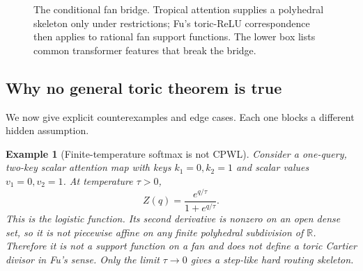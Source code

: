 \documentclass[11pt]{article}
\newtheorem{example}[theorem]{Example}
\newcommand{\R}{\mathbb{R}}
\begin{document}
\begin{figure}[t]
\centering
{}
\caption{The conditional fan bridge.  Tropical attention supplies a polyhedral skeleton only under restrictions; Fu's toric-ReLU correspondence \cite{fu2025toricrelu} then applies to rational fan support functions.  The lower box lists common transformer features that break the bridge.}
\label{fig:toricbridge}
\end{figure}

\subsection{Why no general toric theorem is true}

We now give explicit counterexamples and edge cases.  Each one blocks a different hidden assumption.

\begin{example}[Finite-temperature softmax is not CPWL]
\label{ex:softmax}
Consider a one-query, two-key scalar attention map with keys $k_1=0,k_2=1$ and scalar values $v_1=0,v_2=1$.  At temperature $\tau>0$,
\[
  Z(q)=\frac{e^{q/\tau}}{1+e^{q/\tau}}.
\]
This is the logistic function.  Its second derivative is nonzero on an open dense set, so it is not piecewise affine on any finite polyhedral subdivision of $\R$.  Therefore it is not a support function on a fan and does not define a toric Cartier divisor in Fu's sense.  Only the limit $\tau\to 0$ gives a step-like hard routing skeleton.
\end{example}
\end{document}
